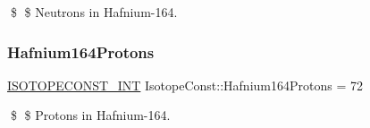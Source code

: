 \$ \$ Neutrons in Hafnium-\/164. \mbox{\label{group___isotope_const-_hafnium-_hf164_gaa86f6ede8928cc1320fd18f90c6fd6de}} 
\subsubsection{\texorpdfstring{Hafnium164\+Protons}{Hafnium164Protons}}
{\footnotesize\ttfamily \mbox{\hyperlink{group___isotope_const-_macros_ga5f18360b3e99483a35c32d789e62621c}{I\+S\+O\+T\+O\+P\+E\+C\+O\+N\+S\+T\+\_\+\+I\+NT}} Isotope\+Const\+::\+Hafnium164\+Protons = 72}

\$ \$ Protons in Hafnium-\/164. 